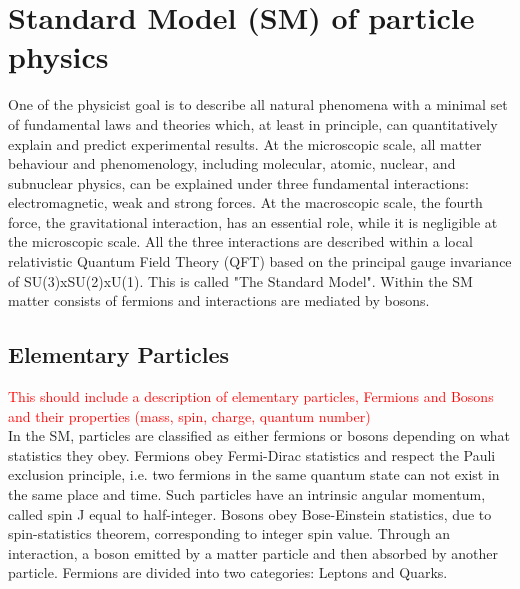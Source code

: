 \section{Standard Model (SM) of particle physics}
\label{chap1:SM}
One of the physicist goal is to describe all natural phenomena with a minimal set of fundamental laws and theories which, at least in principle, can quantitatively explain and predict experimental results. At the microscopic scale, all matter behaviour and phenomenology, including molecular, atomic, nuclear, and subnuclear physics, can be explained under three fundamental interactions: electromagnetic, weak and strong forces. At the macroscopic scale, the fourth force, the gravitational interaction, has an essential role, while it is negligible at the microscopic scale. All the three interactions are described within a local relativistic Quantum Field Theory (QFT) based on the principal gauge invariance of SU(3)xSU(2)xU(1). This is called "The Standard Model". Within the SM matter consists of fermions and interactions are mediated by bosons. 

\subsection{Elementary Particles}
\label{chap1:SM:EP}
\textcolor{red}{
This should include a description of elementary particles, Fermions and  Bosons and their properties (mass, spin, charge, quantum number)
\\ }
In the SM, particles are classified as either fermions or bosons depending on what statistics they obey. Fermions obey Fermi-Dirac statistics and respect the Pauli exclusion principle, i.e. two fermions in the same quantum state can not exist in the same place and time. Such particles have an intrinsic angular momentum, called spin J equal to half-integer. Bosons obey Bose-Einstein statistics, due to spin-statistics theorem, corresponding to integer spin value. Through an interaction, a boson emitted by a matter particle and then absorbed by another particle. Fermions are divided into two categories: Leptons and Quarks.
